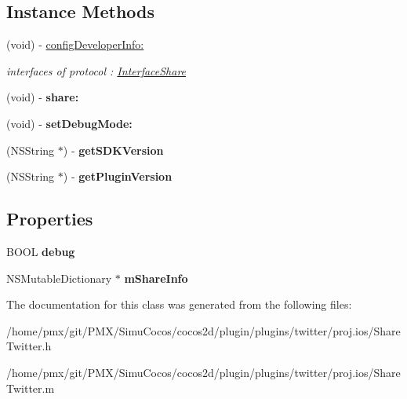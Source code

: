 \subsection*{Instance Methods}
\begin{DoxyCompactItemize}
\item 
\mbox{\label{interfaceShareTwitter_adf7728b015cac682044ec8902c4a4ea7}} 
(void) -\/ \hyperlink{interfaceShareTwitter_adf7728b015cac682044ec8902c4a4ea7}{config\+Developer\+Info\+:}
\begin{DoxyCompactList}\small\item\em interfaces of protocol \+: \hyperlink{classInterfaceShare-p}{Interface\+Share} \end{DoxyCompactList}\item 
\mbox{\label{interfaceShareTwitter_a74e473a8c28c6bf396e46feeff330e81}} 
(void) -\/ {\bfseries share\+:}
\item 
\mbox{\label{interfaceShareTwitter_aba97abd9ed8437b77adbae972037dd0d}} 
(void) -\/ {\bfseries set\+Debug\+Mode\+:}
\item 
\mbox{\label{interfaceShareTwitter_aa468dbbd372e48b5210fc4453e50d927}} 
(N\+S\+String $\ast$) -\/ {\bfseries get\+S\+D\+K\+Version}
\item 
\mbox{\label{interfaceShareTwitter_af7806bb63d17971c64016b2eeb939553}} 
(N\+S\+String $\ast$) -\/ {\bfseries get\+Plugin\+Version}
\end{DoxyCompactItemize}
\subsection*{Properties}
\begin{DoxyCompactItemize}
\item 
\mbox{\label{interfaceShareTwitter_a547c9060ae907597e5e75f0882844916}} 
B\+O\+OL {\bfseries debug}
\item 
\mbox{\label{interfaceShareTwitter_a2322f551d8375eda5ccf76c9a179ffe8}} 
N\+S\+Mutable\+Dictionary $\ast$ {\bfseries m\+Share\+Info}
\end{DoxyCompactItemize}


The documentation for this class was generated from the following files\+:\begin{DoxyCompactItemize}
\item 
/home/pmx/git/\+P\+M\+X/\+Simu\+Cocos/cocos2d/plugin/plugins/twitter/proj.\+ios/Share\+Twitter.\+h\item 
/home/pmx/git/\+P\+M\+X/\+Simu\+Cocos/cocos2d/plugin/plugins/twitter/proj.\+ios/Share\+Twitter.\+m\end{DoxyCompactItemize}
